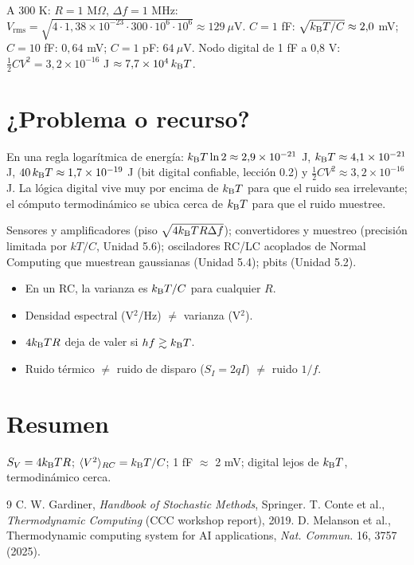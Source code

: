 \documentclass[11pt,a4paper]{article}
\begin{document}
\begin{ejemplo}
A 300 K: $R=1$ M$\Omega$, $\Delta f=1$ MHz: $V_{\text{rms}}=\sqrt{4\cdot1{,}38\times10^{-23}\cdot300\cdot10^6\cdot10^6}\approx129\ \mu$V.
$C=1$ fF: $\sqrt{k_{\mathrm B} T/C}\approx2{,}0$ mV; $C=10$ fF: $0{,}64$ mV; $C=1$ pF: $64\ \mu$V.
Nodo digital de 1 fF a 0,8 V: $\frac12CV^2=3{,}2\times10^{-16}$ J $\approx7{,}7\times10^4\,k_{\mathrm B} T$.
\end{ejemplo}

\section{¿Problema o recurso?}
En una regla logarítmica de energía: $k_{\mathrm B} T\ln2\approx2{,}9\times10^{-21}$ J, $k_{\mathrm B} T\approx4{,}1\times10^{-21}$ J,
$40\,k_{\mathrm B} T\approx1{,}7\times10^{-19}$ J (bit digital confiable, lección 0.2) y $\frac12CV^2\approx3{,}2\times10^{-16}$ J.
La lógica digital vive muy por encima de $k_{\mathrm B} T$ para que el ruido sea irrelevante; el cómputo termodinámico se
ubica cerca de $k_{\mathrm B} T$ para que el ruido muestree.

\begin{aplicacion}
Sensores y amplificadores (piso $\sqrt{4k_{\mathrm B} TR\Delta f}$); convertidores y muestreo (precisión limitada por $kT/C$,
Unidad 5.6); osciladores RC/LC acoplados de Normal Computing que muestrean gaussianas (Unidad 5.4); pbits (Unidad 5.2).
\end{aplicacion}

\begin{error}
\begin{itemize}[nosep]
\item En un RC, la varianza es $k_{\mathrm B} T/C$ para cualquier $R$.
\item Densidad espectral (V$^2$/Hz) $\neq$ varianza (V$^2$).
\item $4k_{\mathrm B} TR$ deja de valer si $hf\gtrsim k_{\mathrm B} T$.
\item Ruido térmico $\neq$ ruido de disparo ($S_I=2qI$) $\neq$ ruido $1/f$.
\end{itemize}
\end{error}

\section{Resumen}
$S_V=4k_{\mathrm B} TR$; $\langle V^2\rangle_{RC}=k_{\mathrm B} T/C$; 1 fF $\approx$ 2 mV; digital lejos de $k_{\mathrm B} T$, termodinámico cerca.

\begin{thebibliography}{9}\small
{} C. W. Gardiner, \emph{Handbook of Stochastic Methods}, Springer.
 T. Conte et al., \emph{Thermodynamic Computing} (CCC workshop report), 2019.
 D. Melanson et al., Thermodynamic computing system for AI applications, \emph{Nat. Commun.} 16, 3757 (2025).
\end{thebibliography}
\end{document}
